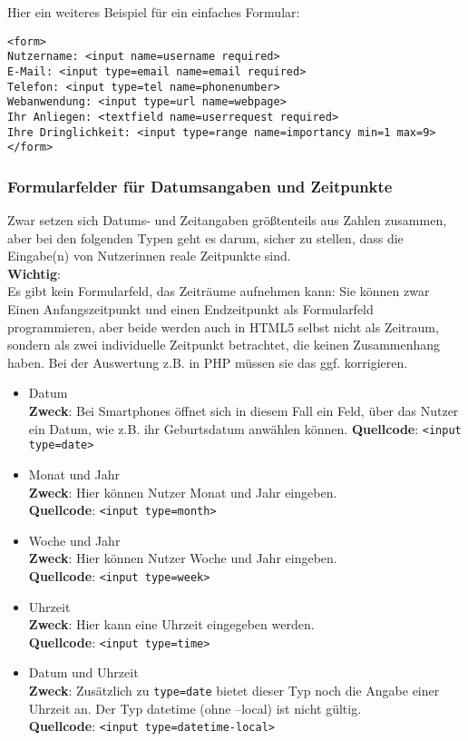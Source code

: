 Hier ein weiteres Beispiel für ein einfaches Formular:

\begin{verbatim}
<form>
Nutzername: <input name=username required>
E-Mail: <input type=email name=email required>
Telefon: <input type=tel name=phonenumber>
Webanwendung: <input type=url name=webpage>
Ihr Anliegen: <textfield name=userrequest required>
Ihre Dringlichkeit: <input type=range name=importancy min=1 max=9>
</form>
\end{verbatim}

\subsubsection{Formularfelder für Datumsangaben und Zeitpunkte}

Zwar setzen sich Datums- und Zeitangaben größtenteils aus Zahlen zusammen, aber bei den folgenden Typen geht es darum, sicher zu stellen, dass die Eingabe(n) von Nutzerinnen reale Zeitpunkte sind.\\

\textbf{Wichtig}:\\

Es gibt kein Formularfeld, das Zeiträume aufnehmen kann: Sie können zwar Einen Anfangszeitpunkt und einen Endzeitpunkt als Formularfeld programmieren, aber beide werden auch in HTML5 selbst nicht als Zeitraum, sondern als zwei individuelle Zeitpunkt betrachtet, die keinen Zusammenhang haben. Bei der Auswertung z.B. in PHP müssen sie das ggf. \glqq{}korrigieren\grqq{}.

\begin{itemize}
	\item Datum\\
	\textbf{Zweck}: Bei Smartphones öffnet sich in diesem Fall ein Feld, über das Nutzer ein Datum, wie z.B. ihr Geburtsdatum anwählen können.	
	\textbf{Quellcode}: \verb|<input type=date>|
	
	\item Monat und Jahr\\
	\textbf{Zweck}: Hier können Nutzer Monat und Jahr eingeben.\\	
	\textbf{Quellcode}: \verb|<input type=month>|

	\item Woche und Jahr\\
	\textbf{Zweck}: Hier können Nutzer Woche und Jahr eingeben.\\	
	\textbf{Quellcode}: \verb|<input type=week>|
	
	\item Uhrzeit\\	
	\textbf{Zweck}: Hier kann eine Uhrzeit eingegeben werden.\\	
	\textbf{Quellcode}: \verb|<input type=time>|

	\item Datum und Uhrzeit\\
	\textbf{Zweck}: Zusätzlich zu \verb|type=date| bietet dieser Typ noch die Angabe einer Uhrzeit an. Der Typ datetime (ohne –local) ist nicht gültig.\\
	\textbf{Quellcode}: \verb|<input type=datetime-local>|
\end{itemize}

